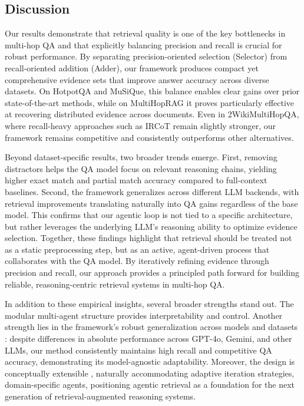 \documentclass{article} %
\begin{document}
\subsection{Discussion}

Our results demonstrate that retrieval quality is one of the key bottlenecks in multi-hop QA and that explicitly balancing precision and recall is crucial for robust performance. By separating precision-oriented selection (Selector) from recall-oriented addition (Adder), our framework produces compact yet comprehensive evidence sets that improve answer accuracy across diverse datasets. On HotpotQA and MuSiQue, this balance enables clear gains over prior state-of-the-art methods, while on MultiHopRAG it proves particularly effective at recovering distributed evidence across documents. Even in 2WikiMultiHopQA, where recall-heavy approaches such as IRCoT remain slightly stronger, our framework remains competitive and consistently outperforms other alternatives.

Beyond dataset-specific results, two broader trends emerge. First, removing distractors helps the QA model focus on relevant reasoning chains, yielding higher exact match and partial match accuracy compared to full-context baselines. Second, the framework generalizes across different LLM backends, with retrieval improvements translating naturally into QA gains regardless of the base model. This confirms that our agentic loop is not tied to a specific architecture, but rather leverages the underlying LLM’s reasoning ability to optimize evidence selection. Together, these 
findings highlight that retrieval should be treated not as a static preprocessing step, but as an active, agent-driven process that collaborates with the QA model. By iteratively refining evidence through precision and recall, our approach provides a principled path forward for building reliable, reasoning-centric retrieval systems in multi-hop QA.

In addition to these empirical insights, several broader strengths stand out. The modular multi-agent structure provides  interpretability and control. Another strength lies in the framework’s  robust generalization across models and datasets : despite differences in absolute performance across GPT-4o, Gemini, and other LLMs, our method consistently maintains high recall and competitive QA accuracy, demonstrating its  model-agnostic adaptability. Moreover, the design is  conceptually extensible , naturally 
accommodating adaptive iteration strategies, domain-specific agents, positioning agentic retrieval as a foundation for the next generation of retrieval-augmented reasoning systems.
\end{document}
